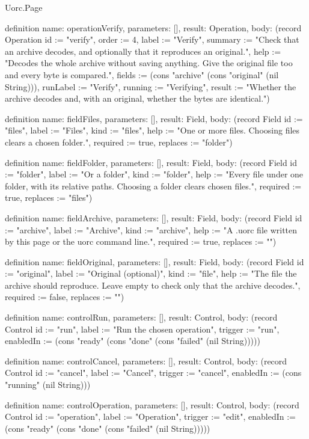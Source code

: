 \begin{lexlean}{Uorc.Page}
\begin{semanticmodule}
definition{
  name: operationVerify,
  parameters: [],
  result: Operation,
  body: (record Operation {id := "verify", order := 4, label := "Verify", summary := "Check that an archive decodes, and optionally that it reproduces an original.", help := "Decodes the whole archive without saving anything. Give the original file too and every byte is compared.", fields := (cons "archive" (cons "original" (nil String))), runLabel := "Verify", running := "Verifying", result := "Whether the archive decodes and, with an original, whether the bytes are identical."})
}

definition{
  name: fieldFiles,
  parameters: [],
  result: Field,
  body: (record Field {id := "files", label := "Files", kind := "files", help := "One or more files. Choosing files clears a chosen folder.", required := true, replaces := "folder"})
}

definition{
  name: fieldFolder,
  parameters: [],
  result: Field,
  body: (record Field {id := "folder", label := "Or a folder", kind := "folder", help := "Every file under one folder, with its relative paths. Choosing a folder clears chosen files.", required := true, replaces := "files"})
}

definition{
  name: fieldArchive,
  parameters: [],
  result: Field,
  body: (record Field {id := "archive", label := "Archive", kind := "archive", help := "A .uorc file written by this page or the uorc command line.", required := true, replaces := ""})
}

definition{
  name: fieldOriginal,
  parameters: [],
  result: Field,
  body: (record Field {id := "original", label := "Original (optional)", kind := "file", help := "The file the archive should reproduce. Leave empty to check only that the archive decodes.", required := false, replaces := ""})
}

definition{
  name: controlRun,
  parameters: [],
  result: Control,
  body: (record Control {id := "run", label := "Run the chosen operation", trigger := "run", enabledIn := (cons "ready" (cons "done" (cons "failed" (nil String))))})
}

definition{
  name: controlCancel,
  parameters: [],
  result: Control,
  body: (record Control {id := "cancel", label := "Cancel", trigger := "cancel", enabledIn := (cons "running" (nil String))})
}

definition{
  name: controlOperation,
  parameters: [],
  result: Control,
  body: (record Control {id := "operation", label := "Operation", trigger := "edit", enabledIn := (cons "ready" (cons "done" (cons "failed" (nil String))))})
}


\end{semanticmodule}
\end{lexlean}
